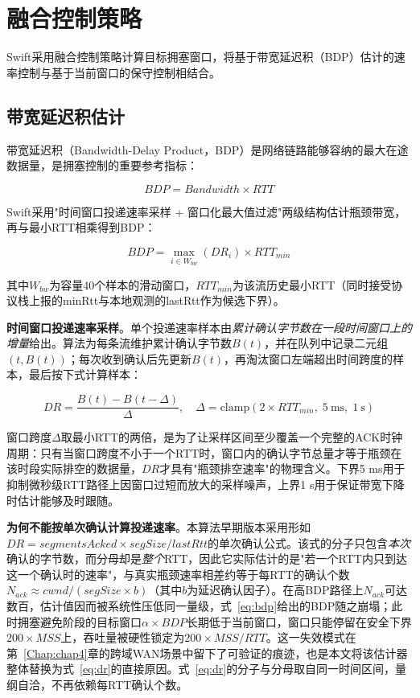 \section{融合控制策略}

Swift采用融合控制策略计算目标拥塞窗口，将基于带宽延迟积（BDP）估计的速率控制与基于当前窗口的保守控制相结合。

\subsection{带宽延迟积估计}

带宽延迟积（Bandwidth-Delay Product，BDP）是网络链路能够容纳的最大在途数据量，是拥塞控制的重要参考指标：

\begin{equation}
BDP = Bandwidth \times RTT
\end{equation}

Swift采用"时间窗口投递速率采样 + 窗口化最大值过滤"两级结构估计瓶颈带宽，再与最小RTT相乘得到BDP：

\begin{equation}
BDP = \max_{i \in W_{bw}}(DR_i) \times RTT_{min}
\label{eq:bdp}
\end{equation}

其中$W_{bw}$为容量40个样本的滑动窗口，$RTT_{min}$为该流历史最小RTT（同时接受协议栈上报的minRtt与本地观测的lastRtt作为候选下界）。

\textbf{时间窗口投递速率采样}。单个投递速率样本由\emph{累计确认字节数在一段时间窗口上的增量}给出。算法为每条流维护累计确认字节数$B(t)$，并在队列中记录二元组$(t, B(t))$；每次收到确认后先更新$B(t)$，再淘汰窗口左端超出时间跨度的样本，最后按下式计算样本：

\begin{equation}
DR = \frac{B(t) - B(t - \Delta)}{\Delta}, \quad \Delta = \mathrm{clamp}(2 \times RTT_{min},\; 5~\text{ms},\; 1~\text{s})
\label{eq:dr}
\end{equation}

窗口跨度$\Delta$取最小RTT的两倍，是为了让采样区间至少覆盖一个完整的ACK时钟周期：只有当窗口跨度不小于一个RTT时，窗口内的确认字节总量才等于瓶颈在该时段实际排空的数据量，$DR$才具有"瓶颈排空速率"的物理含义。下界5 ms用于抑制微秒级RTT路径上因窗口过短而放大的采样噪声，上界1 s用于保证带宽下降时估计能够及时跟随。

\textbf{为何不能按单次确认计算投递速率}。本算法早期版本采用形如$DR = segmentsAcked \times segSize / lastRtt$的单次确认公式。该式的分子只包含\emph{本次}确认的字节数，而分母却是\emph{整个}RTT，因此它实际估计的是"若一个RTT内只到达这一个确认时的速率"，与真实瓶颈速率相差约等于每RTT的确认个数$N_{ack} \approx cwnd/(segSize \times b)$（其中$b$为延迟确认因子）。在高BDP路径上$N_{ack}$可达数百，估计值因而被系统性压低同一量级，式~\eqref{eq:bdp}给出的BDP随之崩塌；此时拥塞避免阶段的目标窗口$\alpha \times BDP$长期低于当前窗口，窗口只能停留在安全下界$200 \times MSS$上，吞吐量被硬性锁定为$200 \times MSS / RTT$。这一失效模式在第~\ref{Chap:chap4}章的跨域WAN场景中留下了可验证的痕迹，也是本文将该估计器整体替换为式~\eqref{eq:dr}的直接原因。式~\eqref{eq:dr}的分子与分母取自同一时间区间，量纲自洽，不再依赖每RTT确认个数。

